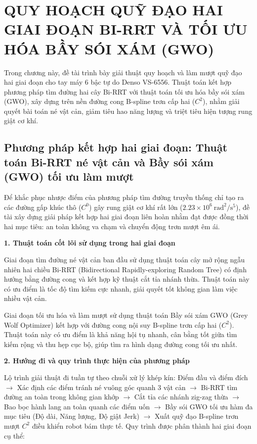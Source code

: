 \chapter{QUY HOẠCH QUỸ ĐẠO HAI GIAI ĐOẠN BI-RRT VÀ TỐI ƯU HÓA BẦY SÓI XÁM (GWO)}
\label{chap:birrt_gwo_optimization}

Trong chương này, đề tài trình bày giải thuật quy hoạch và làm mượt quỹ đạo hai giai đoạn cho tay máy 6 bậc tự do Denso VS-6556. Thuật toán kết hợp phương pháp tìm đường hai cây Bi-RRT với thuật toán tối ưu hóa bầy sói xám (GWO), xây dựng trên nền đường cong B-spline trơn cấp hai ($C^2$), nhằm giải quyết bài toán né vật cản, giảm tiêu hao năng lượng và triệt tiêu hiện tượng rung giật cơ khí.

\section{Phương pháp kết hợp hai giai đoạn: Thuật toán Bi-RRT né vật cản và Bầy sói xám (GWO) tối ưu làm mượt}
\label{sec:two_stage_architecture}

Để khắc phục nhược điểm của phương pháp tìm đường truyền thống chỉ tạo ra các đường gấp khúc thô ($C^0$) gây rung giật cơ khí rất lớn ($2.23 \times 10^6\ \text{rad}^2/\text{s}^5$), đề tài xây dựng giải pháp kết hợp hai giai đoạn liên hoàn nhằm đạt được đồng thời hai mục tiêu: an toàn không va chạm và chuyển động trơn mượt êm ái.

\textbf{1. Thuật toán cốt lõi sử dụng trong hai giai đoạn}

Giai đoạn tìm đường né vật cản ban đầu sử dụng thuật toán cây mở rộng ngẫu nhiên hai chiều Bi-RRT (Bidirectional Rapidly-exploring Random Tree) có định hướng bằng đường cong và kết hợp kỹ thuật cắt tỉa nhánh thừa. Thuật toán này có ưu điểm là tốc độ tìm kiếm cực nhanh, giải quyết tốt không gian làm việc nhiều vật cản.

Giai đoạn tối ưu hóa và làm mượt sử dụng thuật toán Bầy sói xám GWO (Grey Wolf Optimizer) kết hợp với đường cong nội suy B-spline trơn cấp hai ($C^2$). Thuật toán này có ưu điểm là khả năng hội tụ nhanh, cân bằng tốt giữa tìm kiếm rộng và thu hẹp cục bộ, giúp tìm ra hình dạng đường cong tối ưu nhất.

\textbf{2. Hướng đi và quy trình thực hiện của phương pháp}

Lộ trình giải thuật đi tuần tự theo chuỗi xử lý khép kín: Điểm đầu và điểm đích $\to$ Xác định các điểm tránh né vuông góc quanh 3 vật cản $\to$ Bi-RRT tìm đường an toàn trong không gian khớp $\to$ Cắt tỉa các nhánh zig-zag thừa $\to$ Bao bọc hành lang an toàn quanh các điểm uốn $\to$ Bầy sói GWO tối ưu hàm đa mục tiêu (Độ dài, Năng lượng, Độ giật Jerk) $\to$ Xuất quỹ đạo B-spline trơn mượt $C^2$ điều khiển robot bám thực tế. Quy trình được phân thành hai giai đoạn cụ thể:

